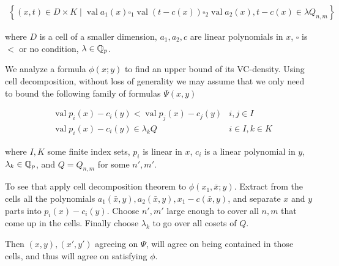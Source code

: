 \documentclass{amsart}
\newcommand{\curly}[1]{\left\{#1\right\}}
\DeclareMathOperator{\val}{val}
\begin{document}
\begin{align*}
	\curly{(x, t) \in D \times K \mid \val a_1(x) \square_1 \val (t - c(x)) \square_2 \val a_2(x), t - c(x) \in \lambda Q_{n,m} }
\end{align*}

where $D$ is a cell of a smaller dimension, $a_1, a_2, c$ are linear polynomials in  $x$, $\square$ is $<$ or no condition, $\lambda  \in\mathbb{Q}_p$.

We analyze a formula $\phi(x; y)$ to find an upper bound of its VC-density. 
Using cell decomposition, without loss of generality we may assume that we only need to bound the following family of formulas $\Psi (x,y)$

\begin{align*}
	&\val p_i(x) - c_i(y) < \val p_j(x) - c_j(y) & i, j \in I \\
	&\val p_i(x) - c_i(y) \in \lambda_k Q & i \in I , k \in K
\end{align*}

where $I, K$ some finite index sets, $p_i$ is linear in $x$, $c_i$ is a linear polynomial in $y$, $\lambda_k \in \mathbb{Q}_p$, and $Q = Q_{n,m}$ for some $n',m'$.

To see that apply cell decomposition theorem to $\phi(x_1, \bar x; y)$.
Extract from the cells all the polynomials $a_1(\bar x, y), a_2(\bar x, y), x_1 - c(\bar x, y)$, and separate $x$ and $y$ parts into $p_i(x) - c_i(y)$.
Choose $n',m'$ large enough to cover all $n,m$ that come up in the cells.
Finally choose $\lambda_k$ to go over all cosets of $Q$.

Then $(x,y),(x',y')$ agreeing on $\Psi$, will agree on being contained in those cells, and thus will agree on satisfying $\phi$.

%
\end{document}
